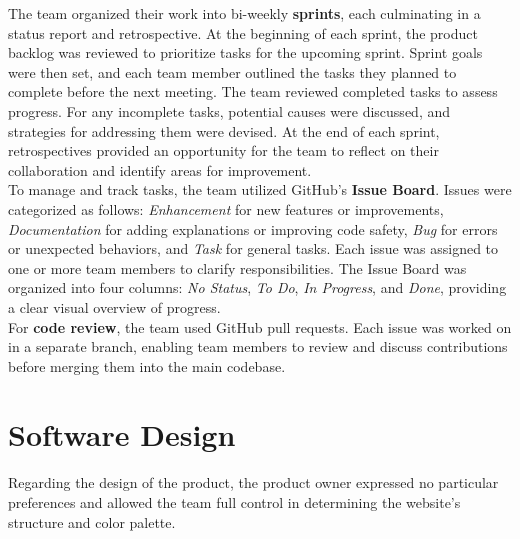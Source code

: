 The team organized their work into bi-weekly \textbf{sprints}, each culminating in a status report and retrospective. At the beginning of each sprint, the product backlog was reviewed to prioritize tasks for the upcoming sprint. Sprint goals were then set, and each team member outlined the tasks they planned to complete before the next meeting. The team reviewed completed tasks to assess progress. For any incomplete tasks, potential causes were discussed, and strategies for addressing them were devised. At the end of each sprint, retrospectives provided an opportunity for the team to reflect on their collaboration and identify areas for improvement. \\

To manage and track tasks, the team utilized GitHub’s \textbf{Issue Board}. Issues were categorized as follows: \textit{Enhancement} for new features or improvements, \textit{Documentation} for adding explanations or improving code safety, \textit{Bug} for errors or unexpected behaviors, and \textit{Task} for general tasks. Each issue was assigned to one or more team members to clarify responsibilities. The Issue Board was organized into four columns: \textit{No Status}, \textit{To Do}, \textit{In Progress}, and \textit{Done}, providing a clear visual overview of progress. \\

For \textbf{code review}, the team used GitHub pull requests. Each issue was worked on in a separate branch, enabling team members to review and discuss contributions before merging them into the main codebase.





\newpage


\section{Software Design}
\label{sec:software-design}

Regarding the design of the product, the product owner expressed no particular preferences and allowed the team full control in determining the website’s structure and color palette.


